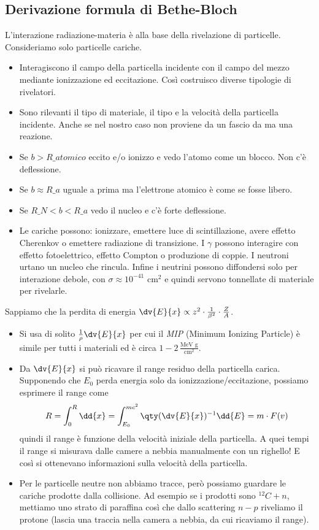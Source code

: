 \subsection{Derivazione formula di Bethe-Bloch}\label{subsec:bethe-bloch}
L'interazione radiazione-materia è alla base della rivelazione di particelle. Consideriamo solo particelle cariche.
\begin{itemize}
    \item Interagiscono il campo della particella incidente con il campo del mezzo mediante ionizzazione ed eccitazione. Così costruisco diverse tipologie di rivelatori. 
    \item Sono rilevanti il tipo di materiale, il tipo e la velocità della particella incidente. Anche se nel nostro caso non proviene da un fascio da ma una reazione. 
    \item Se $b>R\_{atomico}$ eccito e/o ionizzo e vedo l'atomo come un blocco. Non c'è deflessione.
    \item Se $b\approx R\_a$ uguale a prima ma l'elettrone atomico è come se fosse libero.
    \item Se $R\_N<b<R\_a$ vedo il nucleo e c'è forte deflessione.
    \item Le cariche possono: ionizzare, emettere luce di scintillazione, avere effetto Cherenkov o emettere radiazione di transizione. I $\gamma$ possono interagire con effetto fotoelettrico, effetto Compton o produzione di coppie. I neutroni urtano un nucleo che rincula. Infine i neutrini possono diffondersi solo per interazione debole, con $\sigma\approx10^{-41}$ cm$^2$ e quindi servono tonnellate di materiale per rivelarle. 
\end{itemize}
Sappiamo che la perdita di energia $\dv{E}{x}\propto z^2\cdot \frac1{\beta^2}\cdot \frac Z A$. 
\begin{itemize}
    \item Si usa di solito $\frac 1 \rho \dv{E}{x}$ per cui il \textit{MIP} (Minimum Ionizing Particle) è simile per tutti i materiali ed è circa $1-2\, \frac{\text{MeV g}}{\text{cm}^2}$.    
    \item Da $\dv{E}{x}$ si può ricavare il range residuo della particella carica. Supponendo che  $E_0$ perda energia solo da ionizzazione/eccitazione, possiamo esprimere il range come
    \begin{equation*}
        R=\int_0^R\dd{x}=\int_{E_0}^{mc^2} \qty(\dv{E}{x})^{-1}\dd{E}= m\cdot F(v)
    \end{equation*}
    quindi il range è funzione della velocità iniziale della particella. A quei tempi il range si misurava dalle camere a nebbia manualmente con un righello! E così si ottenevano informazioni sulla velocità della particella.
    \item Per le particelle neutre non abbiamo tracce, però possiamo guardare le cariche prodotte dalla collisione. Ad esempio se i prodotti sono $^{12}C+n$, mettiamo uno strato di paraffina così che dallo scattering $n-p$ riveliamo il protone (lascia una traccia nella camera a nebbia, da cui ricaviamo il range).
\end{itemize}
